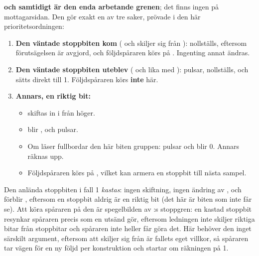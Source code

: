\textbf{ och  samtidigt är den enda arbetande grenen}; det
finns ingen  på mottagarsidan. Den gör exakt en av tre saker, prövade i den här
prioritetsordningen:
\begin{enumerate}
  \item \textbf{Den väntade stoppbiten kom} ( och  skiljer
    sig från ):  nollställs, eftersom förutsägelsen är avgjord,
    och följdspåraren körs på . Ingenting annat ändras.
  \item \textbf{Den väntade stoppbiten uteblev} ( och  lika
    med ):  pulsar,  nollställs, och
     sätts direkt till 1. Följdspåraren körs \textbf{inte} här.
  \item \textbf{Annars, en riktig bit:}
    \begin{itemize}
      \item {} skiftas in i  från höger.
      \item {} blir , och  pulsar.
      \item Om  läser  fullbordar den här biten gruppen:
         pulsar och  blir 0. Annars räknas  upp.
      \item Följdspåraren körs på , vilket kan armera en stoppbit till nästa sampel.
    \end{itemize}
\end{enumerate}

Den anlända stoppbiten i fall 1 \emph{kastas}: ingen skiftning, ingen ändring av ,
och  förblir , eftersom en stoppbit aldrig är en riktig bit (det här
är biten som  inte får se). Att köra spåraren på den är spegelbilden av
:s stoppgren: en kastad stoppbit resynkar spåraren precis som en utsänd gör,
eftersom ledningen inte skiljer riktiga bitar från stoppbitar och spåraren inte heller får göra det.
Här behöver den inget särskilt argument, eftersom att  skiljer sig från 
är fallets eget villkor, så spåraren tar vägen för en ny följd per konstruktion och startar om
räkningen på 1.

